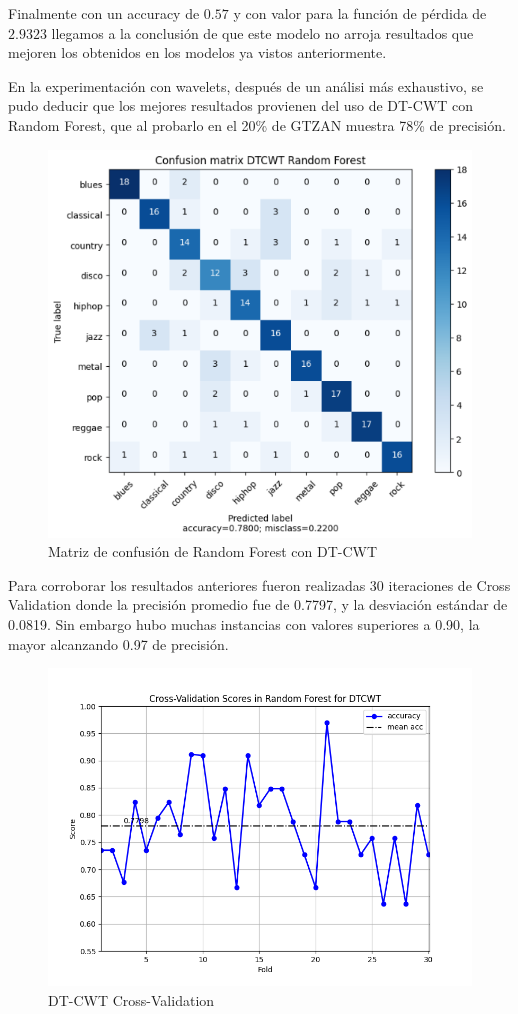 \documentclass[colorinlistoftodos,twoside,twocolumn,10pt]{article} %
\begin{document}
Finalmente con un accuracy de $0.57$ y con valor para la funci\'on de p\'erdida de  $2.9323$ llegamos a la conclusi\'on de que este modelo no arroja resultados que mejoren los obtenidos en los modelos ya vistos anteriormente.

En la experimentaci\'on con wavelets, despu\'es de un an\'alisi m\'as exhaustivo, se pudo deducir que los mejores resultados provienen del uso de DT-CWT con Random Forest, que al probarlo en el 20\% de GTZAN muestra 78\% de precisi\'on.

\begin{figure}[h!] 
\centering
\includegraphics[width=0.9\linewidth]{ConfM_DTCWT_rf.png}
\caption{Matriz de confusi\'on de Random Forest con DT-CWT}
\end{figure}

Para corroborar los resultados anteriores fueron realizadas 30 iteraciones de Cross Validation donde la precisi\'on promedio fue de 0.7797, y la desviaci\'on est\'andar de 0.0819. Sin embargo hubo muchas instancias con valores superiores a 0.90, la mayor alcanzando 0.97 de precisi\'on. 

\begin{figure}[h!] 
\centering
\includegraphics[width=0.9\linewidth]{CV_DTCWT_rf.png}
\caption{DT-CWT Cross-Validation}
\end{figure}
\end{document}

